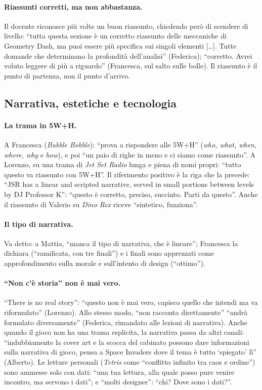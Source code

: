\paragraph{Riassunti corretti, ma non abbastanza.} Il docente riconosce più
volte un buon riassunto, chiedendo però di scendere di livello: ``tutta
questa sezione è un corretto riassunto delle meccaniche di Geometry Dash, ma
puoi essere più specifica sui singoli elementi [\dots]. Tutte domande che
determinano la profondità dell'analisi'' (Federica); ``corretto. Avrei voluto
leggere di più a riguardo'' (Francesca, sul salto sulle bolle). Il riassunto
è il punto di partenza, non il punto d'arrivo.

\subsection{Narrativa, estetiche e tecnologia}
\label{rv:t1:sec:narrativa}

\paragraph{La trama in 5W+H.} A Francesca (\emph{Bubble Bobble}): ``prova a
rispondere alle 5W+H'' (\emph{who, what, when, where, why} e \emph{how}),
e poi ``un paio di righe in meno e ci siamo come riassunto''. A Lorenzo, su
una trama di \emph{Jet Set Radio} lunga e piena di nomi propri: ``tutto
questo va riassunto con 5W+H''. Il riferimento positivo è la riga che la
precede: ``JSR has a linear and scripted narrative, served in small portions
between levels by DJ Professor K'': ``questo è corretto, preciso, succinto.
Parti da questo''. Anche il riassunto di Valerio su \emph{Dino Rex} riceve
``sintetico, funziona''.

\paragraph{Il tipo di narrativa.} Va detto: a Mattia, ``manca il tipo di
narrativa, che è lineare''; Francesca la dichiara (``ramificata, con tre
finali'') e i finali sono apprezzati come approfondimento sulla morale e
sull'intento di design (``ottimo'').

\paragraph{``Non c'è storia'' non è mai vero.} ``There is no real story'':
``questo non è mai vero, capisco quello che intendi ma va riformulato''
(Lorenzo). Allo stesso modo, ``non racconta direttamente'' ``andrà formulato
diversamente'' (Federica, rimandato alle lezioni di narrativa). Anche quando
il gioco non ha una trama esplicita, la narrativa passa da altri canali:
``indubbiamente la cover art e la scocca del cabinato possono dare
informazioni sulla narrativa di gioco, pensa a Space Invaders dove il tema è
tutto `spiegato' lì'' (Alberto). Le letture personali (\emph{Tetris} come
``conflitto infinito tra caos e ordine'') sono ammesse solo con dati: ``una
tua lettura, alla quale posso pure venire incontro, ma servono i dati''; e
``molti designer'': ``chi? Dove sono i dati?''.

